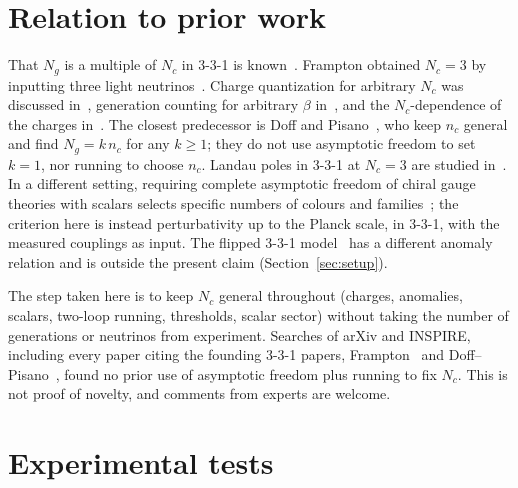 \documentclass[11pt,a4paper]{article}
\newcommand{\Nc}{N_c}
\newcommand{\Ng}{N_g}
\begin{document}
\section{Relation to prior work}\label{sec:prior}

That $\Ng$ is a multiple of $\Nc$ in 3-3-1 is known~\cite{Pisano:1992bxx,Frampton:1992wt,Pisano:1996ht,Doff:2000pc}.
Frampton obtained $\Nc=3$ by inputting three light neutrinos~\cite{Frampton:1994rt}.
Charge quantization for arbitrary $\Nc$ was discussed in~\cite{Geng:2000pf}, generation
counting for arbitrary $\beta$ in~\cite{Diaz:2004fs}, and the $\Nc$-dependence of the
charges in~\cite{Bar:2001qk}. The closest predecessor is Doff and Pisano~\cite{Doff:2000tx},
who keep $n_c$ general and find $\Ng=k\,n_c$ for any $k\ge1$; they do not use asymptotic
freedom to set $k=1$, nor running to choose $n_c$. Landau poles in 3-3-1 at $\Nc=3$ are
studied in~\cite{Dias:2004dc,Barela:2023oyp,Morisi:2025svd}. In a different setting,
requiring complete asymptotic freedom of chiral gauge theories with scalars selects
specific numbers of colours and families~\cite{Cacciapaglia:2026}; the criterion here is
instead perturbativity up to the Planck scale, in 3-3-1, with the measured couplings as
input. The flipped 3-3-1 model~\cite{Fonseca:2016tbn} has a different anomaly relation and
is outside the present claim (Section~\ref{sec:setup}).

The step taken here is to keep $\Nc$ general throughout (charges, anomalies, scalars,
two-loop running, thresholds, scalar sector) without taking the number of generations or
neutrinos from experiment. Searches of arXiv and INSPIRE, including every paper citing
the founding 3-3-1 papers, Frampton~\cite{Frampton:1994rt} and Doff--Pisano~\cite{Doff:2000tx},
found no prior use of asymptotic freedom plus running to fix $\Nc$. This is not proof of
novelty, and comments from experts are welcome.

\section{Experimental tests}\label{sec:tests}
\end{document}
